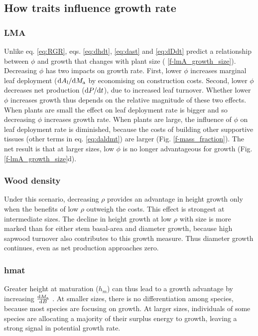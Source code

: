 \documentclass[a4paper,11pt]{article}
\begin{document}
\subsection{How traits influence growth rate}

\subsubsection{LMA}

Unlike eq. \ref{eq:RGR}, eqs. \ref{eq:dhdt}, \ref{eq:dast} and
\ref{eq:dDdt} predict a relationship between $\phi$ and growth that
changes with plant size ( \ref{f-lmA_growth_size}).
Decreasing $\phi$ has two impacts on growth rate. First, lower
$\phi$ increases marginal leaf deployment
(${\rm d}A_{\rm l} / {\rm d}M_{\rm a}$ by economising on
construction costs. Second, lower $\phi$ decreases net production
(${\rm d}P / {\rm d}t$), due to increased leaf turnover. Whether
lower $\phi$ increases growth thus depends on the relative magnitude
of these two effects. When plants are small the effect on leaf
deployment rate is bigger and so decreasing $\phi$ increases growth
rate. When plants are large, the influence of $\phi$ on leaf
deployment rate is diminished, because the costs of building other
supportive tissues (other terms in eq. \ref{eq:daldmt}) are larger (Fig.
\ref{f-mass_fraction}). The net result is that at larger sizes, low
$\phi$ is no longer advantageous for growth (Fig.
\ref{f-lmA_growth_size}d).

\subsubsection{Wood density}

Under this scenario, decreasing $\rho$ provides an advantage in height
growth only when the benefits of low $\rho$ outweigh the costs. This
effect is strongest at intermediate sizes. The decline in height growth
at low $\rho$ with size is more marked than for either stem basal-area
and diameter growth, because high sapwood turnover also contributes to
this growth measure. Thus diameter growth continues, even as net
production approaches zero.

\subsubsection{hmat}

 Greater height at maturation ($h_m$)
can thus lead to a growth advantage by increasing
$\frac{{\rm d}M_{\rm a}}{{\rm d}B}$ . At smaller sizes, there is no differentiation
among species, because most species are focusing on growth. At larger sizes, individuals of some species are
allocating a majority of their surplus energy to growth, leaving a
strong signal in potential growth rate.
\end{document}
